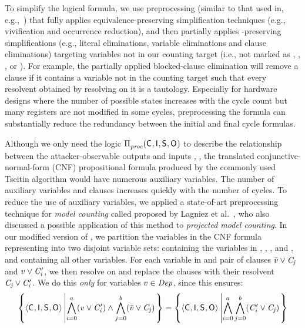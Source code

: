 To simplify the logical formula, we use preprocessing (similar to that
used in, e.g.,~\cite{klebanov2013sat,manthey2012coprocessor}) that
fully applies equivalence-preserving simplification techniques (e.g.,
vivification and occurrence reduction), and then partially applies
\sat-preserving simplifications (e.g., literal eliminations, variable
eliminations and clause eliminations) targeting variables not in our
counting target (i.e., not marked as \SecVar, \AIIVar, \ACIVar, or
\AOOVar). For example, the partially applied blocked-clause
elimination will remove a clause if it contains a variable not in the
counting target such that every resolvent obtained by resolving on it
is a tautology.  Especially for hardware designs where the number of
possible states increases with the cycle count but many registers are
not modified in some cycles, preprocessing the formula can
substantially reduce the redundancy between the initial and final cycle
formulas.

Although we only need the logic
$\Pi_{\mathit{proc}}^{}(\mathsf{C}_{}, \mathsf{I}_{}, \mathsf{S}_{}, \mathsf{O}_{})$ to
describe the relationship between the attacker-observable outputs
\AOOFn{} and inputs \ACIFn{}, \AIIFn{}, \SecFn{} the translated
conjunctive-normal-form (CNF) propositional formula \satProp produced
by the commonly used Tseitin algorithm would have numerous auxiliary
variables.  The number of auxiliary variables and clauses increases
quickly with the number of cycles.  To reduce the use of auxiliary
variables, we applied a state-of-art preprocessing technique for
\textit{model counting} called \BE proposed by Lagniez et
al.~\cite{lagniez2016improving}, who also discussed a possible
application of this method to \textit{projected model counting}.  In
our modified version of \BE, we partition the variables in the CNF
formula representing \postcondition{\proc}{} into two disjoint variable
sets: \supportVars containing the variables in \AIIKeys, \ACIKeys,
\SecKeys, and \AOOKeys, and \reducibleVars containing all other
variables.  For each variable \redVar in \reducibleVars and pair of
clauses $\bar{v} \vee \mathit{C_{j}}$ and $v \vee
\mathit{C'_{i}}$, we then resolve on \redVar and replace the clauses
with their resolvent $\mathit{C_{j}} \vee \mathit{C'_{i}}$.  We do
this \textit{only} for variables $v \in \mathit{Dep}$, since
this ensures:
\begin{align*}
  \left\{\langle \mathsf{C}_{}, \mathsf{I}_{}, \mathsf{S}_{}, \mathsf{O}_{}\rangle
  \left|\bigwedge_{i=0}^{a}(v \vee \mathit{C'_{i}}) \wedge
\bigwedge_{j=0}^{b}(\bar{v} \vee
\mathit{C_{j}}) \right.\right\}
= \left\{\langle \mathsf{C}_{}, \mathsf{I}_{}, \mathsf{S}_{}, \mathsf{O}_{}\rangle
\left| \bigwedge_{i=0}^{a}\bigwedge_{j=0}^{b}
(\mathit{C'_{i}}\vee\mathit{C_{j}})
\right.\right\}
\end{align*}

